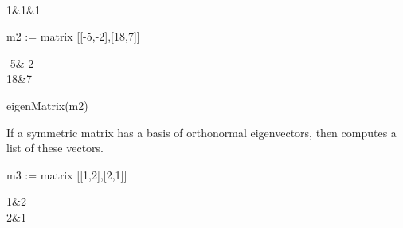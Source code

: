 {{{{{{{{{{{\begin{xtc}
\begin{TeXOutput}
\begin{fricasmath}{7}
\begin{MATRIX}{3}
{}\\1&1&1\end{MATRIX}%
\end{fricasmath}
\end{TeXOutput}
\end{xtc}
\begin{xtc}
\begin{xtccomment}
\end{xtccomment}
\begin{spadsrc}
m2 := matrix [[-5,-2],[18,7]] 
\end{spadsrc}
\begin{TeXOutput}
\begin{fricasmath}{8}
\begin{MATRIX}{2}-{5}&-{2}\\18&7\end{MATRIX}%
\end{fricasmath}
\end{TeXOutput}
\end{xtc}
\begin{xtc}
\begin{xtccomment}
\end{xtccomment}
\begin{spadsrc}
eigenMatrix(m2) 
\end{spadsrc}
\begin{TeXOutput}
\begin{fricasmath}{9}
%
\end{fricasmath}
\end{TeXOutput}
\end{xtc}
%
%
\begin{xtc}
\begin{xtccomment}
If a symmetric matrix
has a basis of orthonormal eigenvectors, then
 computes a list of these vectors.
\end{xtccomment}
\begin{spadsrc}
m3 := matrix [[1,2],[2,1]] 
\end{spadsrc}
\begin{TeXOutput}
\begin{fricasmath}{10}
\begin{MATRIX}{2}1&2\\2&1\end{MATRIX}%
\end{fricasmath}

\end{TeXOutput}
\end{xtc}}}}}}}}}}}}
